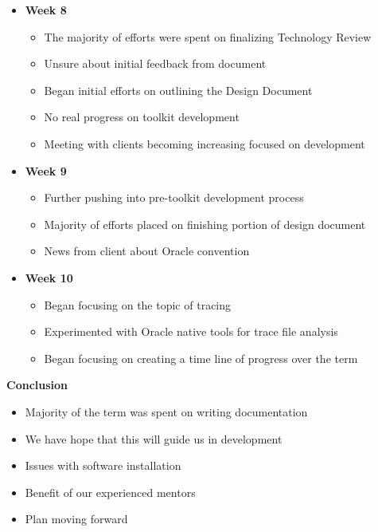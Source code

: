 \documentclass[xcolor=dvipsnames]{beamer}
\begin{document}
\begin{frame}
\begin{itemize}
	\item \textbf{Week 8}
    \begin{itemize}
    	\item The majority of efforts were spent on finalizing Technology Review
        \item Unsure about initial feedback from document
        \item Began initial efforts on outlining the Design Document
        \item No real progress on toolkit development
        \item Meeting with clients becoming increasing focused on development
	\end{itemize}
\end{itemize}
\end{frame}

\begin{frame}
\begin{itemize}
	\item \textbf{Week 9}
    \begin{itemize}
    	\item Further pushing into pre-toolkit development process
        \item Majority of efforts placed on finishing portion of design document
        \item News from client about Oracle convention
	\end{itemize}
\end{itemize}
\end{frame}

\begin{frame}
\begin{itemize}
	\item \textbf{Week 10}
    \begin{itemize}
    	\item Began focusing on the topic of tracing
        \item Experimented with Oracle native tools for trace file analysis
        \item Began focusing on creating a time line of progress over the term
	\end{itemize}
\end{itemize}
\end{frame}

\begin{frame}
	\textbf{Conclusion} \\
   	\begin{itemize}
    	\item Majority of the term was spent on writing documentation
        \item We have hope that this will guide us in development
        \item Issues with software installation
        \item Benefit of our experienced mentors
        \item Plan moving forward
        
    \end{itemize}
\end{frame}
\end{document}
